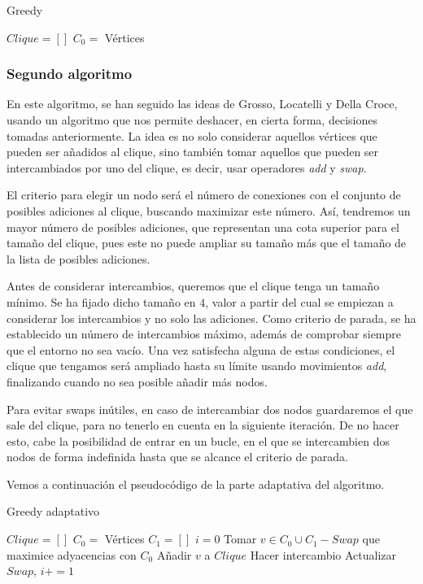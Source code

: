 \begin{algorithm}[H]
\caption{Greedy}
  \begin{algorithmic}
  \State $Clique = [ ]$
  \State $C_0 = $ Vértices
  \Repeat
  \end{algorithmic}
\end{algorithm}


\subsubsection{Segundo algoritmo}

En este algoritmo, se han seguido las ideas de Grosso, Locatelli y Della Croce, usando un algoritmo
que nos permite deshacer, en cierta forma, decisiones tomadas anteriormente. La idea es no solo
considerar aquellos vértices que pueden ser añadidos al clique, sino también tomar aquellos que
pueden ser intercambiados por uno del clique, es decir, usar operadores \textit{add} y \textit{swap}.

El criterio para elegir un nodo será el número de conexiones con el conjunto de posibles adiciones
al clique, buscando maximizar este número. Así, tendremos un mayor número de posibles adiciones, que
representan una cota superior para el tamaño del clique, pues este no puede ampliar su tamaño
más que el tamaño de la lista de posibles adiciones.

Antes de considerar intercambios, queremos que el clique tenga un tamaño mínimo. Se ha fijado
dicho tamaño en $4$, valor a partir del cual se empiezan a considerar los intercambios y no
solo las adiciones. Como criterio de parada, se ha establecido un número de intercambios máximo,
además de comprobar siempre que el entorno no sea vacío. Una vez satisfecha alguna de estas
condiciones, el clique que tengamos será ampliado hasta su límite usando movimientos \textit{add},
finalizando cuando no sea posible añadir más nodos.

Para evitar swaps inútiles, en caso de intercambiar dos nodos guardaremos el que
sale del clique, para no tenerlo en cuenta en la siguiente iteración. De no hacer esto, cabe la
posibilidad de entrar en un bucle, en el que se intercambien dos nodos de forma indefinida
hasta que se alcance el criterio de parada.

Vemos a continuación el pseudocódigo de la parte adaptativa del algoritmo.


\begin{algorithm}[H]
\caption{Greedy adaptativo}
  \begin{algorithmic}
  \State $Clique = [ ]$
  \State $C_0 = $ Vértices
  \State $C_1 = [ ]$
  \State $i = 0$
  \Repeat
    \State Tomar $v \in C_0 \cup C_1 - Swap$ que maximice adyacencias con $C_0$
      \State Añadir $v$ a $Clique$
    \Else
      \State Hacer intercambio
      \State Actualizar $Swap$, $i += 1$
    \EndIf
  \end{algorithmic}
\end{algorithm}


